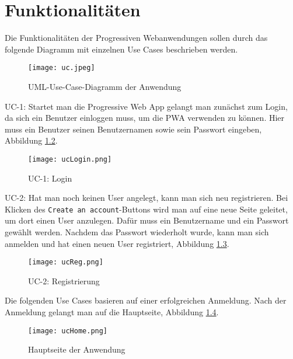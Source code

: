\chapter{Funktionalitäten}

Die Funktionalitäten der Progressiven Webanwendungen sollen durch das folgende Diagramm mit einzelnen Use Cases beschrieben werden.

\begin{figure}[!htb]
    \centering
    \texttt{[image: uc.jpeg]}
    \caption{UML-Use-Case-Diagramm der Anwendung}
    \label{img:uc}
\end{figure}

\clearpage

UC-1:
Startet man die Progressive Web App gelangt man zunächst zum Login, da sich ein Benutzer einloggen muss, um die PWA verwenden zu können. Hier muss ein Benutzer seinen Benutzernamen sowie sein Passwort eingeben, Abbildung \ref{uc1}.

\begin{figure}[!htb]
    \centering
    \texttt{[image: ucLogin.png]}
    \caption{UC-1: Login}
    \label{uc1}
\end{figure}

\clearpage

UC-2: 
Hat man noch keinen User angelegt, kann man sich neu registrieren. Bei Klicken des \texttt{Create an account}-Buttons wird man auf eine neue Seite geleitet, um dort einen User anzulegen. Dafür muss ein Benutzername und ein Passwort gewählt werden. Nachdem das Passwort wiederholt wurde, kann man sich anmelden und hat einen neuen User registriert, Abbildung \ref{uc2}. 

\begin{figure}[!htb]
    \centering
    \texttt{[image: ucReg.png]}
    \caption{UC-2: Registrierung}
    \label{uc2}
\end{figure}

\clearpage

Die folgenden Use Cases basieren auf einer erfolgreichen Anmeldung. Nach der Anmeldung gelangt man auf die Hauptseite, Abbildung \ref{uchome}.

\begin{figure}[!htb]
    \centering
    \texttt{[image: ucHome.png]}
    \caption{Hauptseite der Anwendung}
    \label{uchome}
\end{figure}

\newpage

